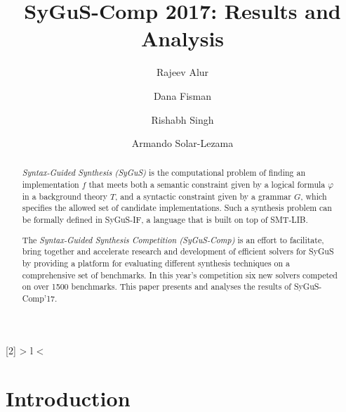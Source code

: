 \documentclass[submission,copyright,creativecommons]{eptcs}
\title{SyGuS-Comp 2017: Results and Analysis}
\author{
Rajeev Alur 
\institute{University of Pennsylvania}
\and
Dana Fisman
\institute{Ben-Gurion University}
\and
Rishabh Singh
\institute{Microsoft Research, Redmond}
\and
Armando Solar-Lezama
\institute{Massachusetts Institute of Technology}
}
\begin{document}
\maketitle

\newcommand{\commentout}[1]{}
\newcommand{\alc}{\textsc{Alchemist-cs}}
\newcommand{\alccsdt}{\textsc{Alchemist-csdt}}
\newcommand{\cvc}{\textsc{CVC4}}
\newcommand{\cvclast}{\ensuremath{\textsc{CVC4}_{2016}}}
\newcommand{\enum}{\textsc{Enumerative}}
\newcommand{\skac}{\textsc{Sketch-ac}}
\newcommand{\ice}{\textsc{Ice-dt}}
\newcommand{\toast}{\textsc{SosyToast}}
\newcommand{\stoch}{\textsc{Stochastic}}
\newcommand{\cvcnew}{\ensuremath{\textsc{CVC4}_{2017}}}
\newcommand{\eusolver}{\textsc{EUSolver}}
\newcommand{\eusolverlast}{\ensuremath{\textsc{EUSolver}_{2016}}}
\newcommand{\eusolvernew}{\ensuremath{\textsc{EUSolver}_{2017}}}
\newcommand{\euphony}{\textsc{Euphony}}
\newcommand{\ethree}{\textsc{e3solver}}
\newcommand{\dryd}{\textsc{DryadSynth}}
\newcommand{\lig}{\textsc{LoopInvGen}}
\newcommand{\sygus}{SyGuS}
\newcommand{\comp}{SyGuS-Comp}

\newcolumntype{R}[2]{%
	>{\bgroup}%
	l%
	<{\egroup}%
}
\newcommand*\rot{\multicolumn{1}{R{90}{1em}}}%



\begin{abstract}
\emph{Syntax-Guided Synthesis (SyGuS)} is
the computational problem of finding an implementation $f$ that
meets both a semantic constraint
given by a logical formula $\varphi$ in a background theory $T$,
and a syntactic constraint given by a grammar $G$, which specifies the allowed set of
candidate implementations.
Such a synthesis problem can be formally defined in SyGuS-IF,
a language that is built on top of SMT-LIB.


The \emph{Syntax-Guided Synthesis Competition (\comp)} is an
effort to facilitate, bring together and accelerate research and development of efficient
solvers for SyGuS by providing a platform for evaluating different synthesis
techniques on a comprehensive set of benchmarks. 
In this year's competition six new solvers competed on over 1500 benchmarks.
This paper presents and analyses the results of \comp'17.
\end{abstract}

\section{Introduction}
\label{sec:intro}

\end{document}
